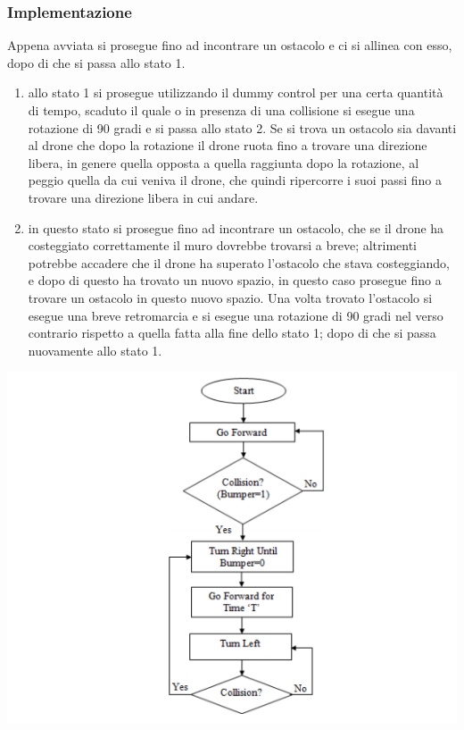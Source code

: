\documentclass{article}
\begin{document}
\subsubsection{Implementazione}
Appena avviata si prosegue fino ad incontrare un ostacolo e ci si allinea con esso, dopo di che si passa allo stato 1.
\begin{enumerate}
    \item allo stato 1 si prosegue utilizzando il dummy control per una certa quantità di tempo, scaduto il quale o in presenza di una collisione si esegue una rotazione di 90 gradi e si passa allo stato 2. Se si trova un ostacolo sia davanti al drone che dopo la rotazione il drone ruota fino a trovare una direzione libera, in genere quella opposta a quella raggiunta dopo la rotazione, al peggio quella da cui veniva il drone, che quindi ripercorre i suoi passi fino a trovare una direzione libera in cui andare.
    \item in questo stato si prosegue fino ad incontrare un ostacolo, che se il drone ha costeggiato correttamente il muro dovrebbe trovarsi a breve; altrimenti potrebbe accadere che il drone ha superato l'ostacolo che stava costeggiando, e dopo di questo ha trovato un nuovo spazio, in questo caso prosegue fino a trovare un ostacolo in questo nuovo spazio. Una volta trovato l'ostacolo si esegue una breve retromarcia e si esegue una rotazione di 90 gradi nel verso contrario rispetto a quella fatta alla fine dello stato 1; dopo di che si passa nuovamente allo stato 1.
\end{enumerate}

\begin{center}
\includegraphics[scale=0.6]{media/schema boundary walk.png}
\end{center}
\end{document}
